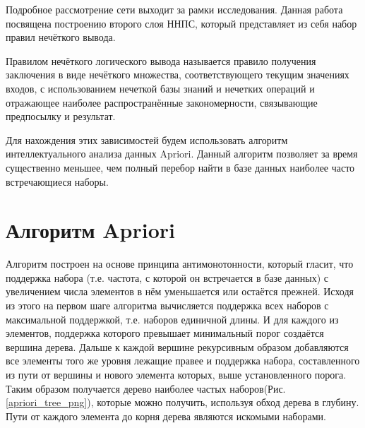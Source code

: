\documentclass[a4paper,12pt]{article}
\begin{document}
Подробное рассмотрение сети выходит за рамки исследования. Данная работа посвящена построению второго слоя ННПС, который представляет из себя набор правил нечёткого вывода. 

Правилом нечёткого логического вывода называется правило получения заключения в виде нечёткого множества, соответствующего текущим значениях входов, с использованием нечеткой базы знаний и нечетких операций и отражающее наиболее распространённые закономерности, связывающие предпосылку и результат.

Для нахождения этих зависимостей будем использовать алгоритм интеллектуального анализа данных Apriori. Данный алгоритм позволяет за время существенно меньшее, чем полный перебор найти в базе данных наиболее часто встречающиеся наборы.

\section{Алгоритм Apriori}

Алгоритм построен на основе принципа антимонотонности, который гласит, что поддержка набора (т.е. частота, с которой он встречается в базе данных) с увеличением числа элементов в нём уменьшается или остаётся прежней. Исходя из этого на первом шаге алгоритма вычисляется поддержка всех наборов с максимальной поддержкой, т.е. наборов единичной длины. И для каждого из элементов, поддержка которого превышает минимальный порог создаётся вершина дерева. Дальше к каждой вершине рекурсивным образом добавляются все элементы того же уровня лежащие правее и поддержка набора, составленного из пути от вершины и нового элемента которых, выше установленного порога. Таким образом получается дерево наиболее частых наборов(Рис. \ref{apriori_tree_png}), которые можно получить, используя обход дерева в глубину. Пути от каждого элемента до корня дерева являются искомыми наборами.

\begin{center}
\end{center}




\end{document}
